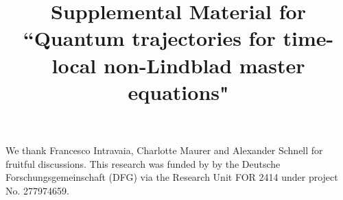 \documentclass[twocolumn,prl,superscriptaddress]{revtex4-2}
\makeatletter
\def\maketitle{
	\@author@finish
	\title@column\titleblock@produce
	\suppressfloats[t]}
\makeatother
\begin{document}
\begin{acknowledgments}
	We thank Francesco Intravaia, Charlotte Maurer and Alexander Schnell for fruitful discussions. 
	This research was funded by by the Deutsche Forschungsgemeinschaft (DFG) via the Research Unit FOR 2414 under project No. 277974659.
\end{acknowledgments}
















\clearpage

\title{Supplemental Material for\\``Quantum trajectories for time-local non-Lindblad master equations"}
\maketitle

\setcounter{equation}{0}
\makeatletter
\renewcommand{\theequation}{A\arabic{equation}}

\onecolumngrid
\end{document}

